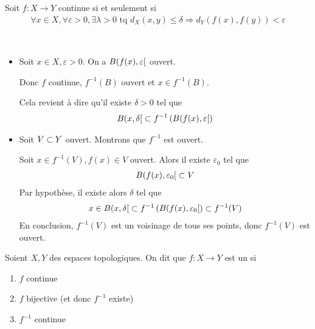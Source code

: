 \documentclass[french,a4paper,10pt]{article}
\begin{document}
		\begin{proposition}
			Soit $f\colon X\to Y$ continue si et seulement si 
				\[\begin{aligned}
					\forall x\in X, \forall \varepsilon>0,\exists\lambda>0\text{ tq }d_X(x,y)\le\delta\Longrightarrow d_Y(f(x),f(y))<\varepsilon
				\end{aligned}\]
		\end{proposition}
		\begin{myproof}\,
			\begin{itemize}[$\Longleftarrow$]
				\item Soit $x\in X,\varepsilon>0$. On a $B({f(x),\varepsilon}\mathopen{}[\mathclose{}$ ouvert.
					
					Donc $f$ continue, $f^{-1}(B)$ ouvert et $x\in f^{-1}(B)$.
					
					Cela revient à dire qu'il existe $\delta>0$ tel que
						\[\begin{aligned}
							B({x,\delta}\mathopen{}[\mathclose{}\subset f^{-1}\left(B({f(x),\varepsilon}\mathopen{}[\mathclose{}\right)
						\end{aligned}\]
			\end{itemize}
			\begin{itemize}[$\Longrightarrow$]
				\item Soit $V\subset Y$ ouvert. Montrons que $f^{-1}$ est ouvert.
				
				Soit $x\in f^{-1}(V),f(x)\in V$ ouvert. Alors il existe $\varepsilon_0$ tel que 
					\[\begin{aligned}
						B({f(x),\varepsilon_0}\mathopen{}[\mathclose{}\subset V
					\end{aligned}\]
				Par hypothèse, il existe alors $\delta$ tel que
					\[\begin{aligned}
						x\in B({x,\delta}\mathopen{}[\mathclose{}\subset f^{-1}\left(B({f(x),\varepsilon_0}\mathopen{}[\mathclose{}\right)\subset f^{-1}(V)
					\end{aligned}\]
				En conclusion, $f^{-1}(V)$ est un voisinage de tous ses points, donc $f^{-1}(V)$ est ouvert.
			\end{itemize}
		\end{myproof}
		\begin{definition}
			Soient $X, Y$ des espaces topologiques. On dit que $f\colon X\to Y$ est un  si 
				\begin{enumerate}[label=$(\roman*)$]
					\item $f$ continue
					\item $f$ bijective (et donc $f^{-1}$ existe)
					\item $f^{-1}$ continue
				\end{enumerate}
		\end{definition}
\end{document}
